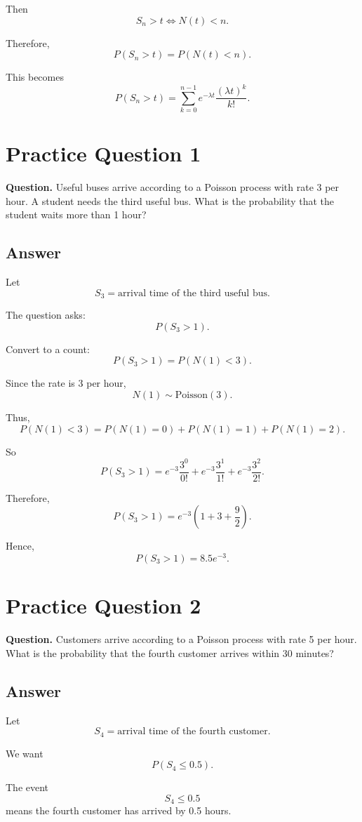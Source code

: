 \documentclass[12pt]{article}
\begin{document}
Then
\[
\boxed{S_n>t \iff N(t)<n.}
\]

Therefore,
\[
\boxed{P(S_n>t)=P(N(t)<n).}
\]

This becomes
\[
\boxed{
P(S_n>t)
=
\sum_{k=0}^{n-1} e^{-\lambda t}\frac{(\lambda t)^k}{k!}.
}
\]

\section*{Practice Question 1}

\textbf{Question.} Useful buses arrive according to a Poisson process with rate 3 per
hour. A student needs the third useful bus. What is the probability that the student
waits more than 1 hour?

\subsection*{Answer}

Let
\[
S_3=\text{arrival time of the third useful bus}.
\]

The question asks:
\[
P(S_3>1).
\]

Convert to a count:
\[
P(S_3>1)=P(N(1)<3).
\]

Since the rate is 3 per hour,
\[
N(1)\sim \text{Poisson}(3).
\]

Thus,
\[
P(N(1)<3)=P(N(1)=0)+P(N(1)=1)+P(N(1)=2).
\]

So
\[
P(S_3>1)
=
e^{-3}\frac{3^0}{0!}
+e^{-3}\frac{3^1}{1!}
+e^{-3}\frac{3^2}{2!}.
\]

Therefore,
\[
P(S_3>1)
=
e^{-3}\left(1+3+\frac{9}{2}\right).
\]

Hence,
\[
\boxed{P(S_3>1)=8.5e^{-3}.}
\]

\section*{Practice Question 2}

\textbf{Question.} Customers arrive according to a Poisson process with rate 5 per hour.
What is the probability that the fourth customer arrives within 30 minutes?

\subsection*{Answer}

Let
\[
S_4=\text{arrival time of the fourth customer}.
\]

We want
\[
P(S_4\leq 0.5).
\]

The event
\[
S_4\leq 0.5
\]
means the fourth customer has arrived by 0.5 hours.
\end{document}
